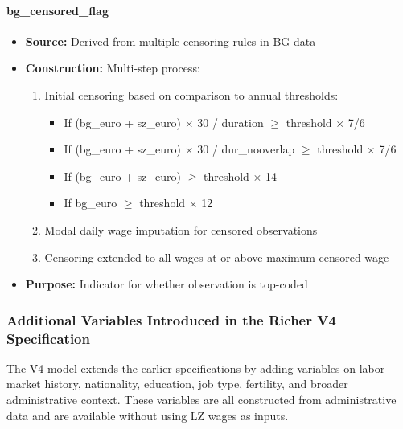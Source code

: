 \documentclass{article}
\begin{document}
\paragraph{bg\_censored\_flag}
\begin{itemize}
    \item \textbf{Source:} Derived from multiple censoring rules in BG data
    \item \textbf{Construction:} Multi-step process:
    \begin{enumerate}
        \item Initial censoring based on comparison to annual thresholds:
        \begin{itemize}
            \item If (bg\_euro + sz\_euro) $\times$ 30 / duration $\geq$ threshold $\times$ 7/6
            \item If (bg\_euro + sz\_euro) $\times$ 30 / dur\_nooverlap $\geq$ threshold $\times$ 7/6  
            \item If (bg\_euro + sz\_euro) $\geq$ threshold $\times$ 14
            \item If bg\_euro $\geq$ threshold $\times$ 12
        \end{itemize}
        \item Modal daily wage imputation for censored observations
        \item Censoring extended to all wages at or above maximum censored wage
    \end{enumerate}
    \item \textbf{Purpose: } Indicator for whether observation is top-coded
\end{itemize}










\subsubsection{Additional Variables Introduced in the Richer V4 Specification}

The V4 model extends the earlier specifications by adding variables on labor market history, nationality, education, job type, fertility, and broader administrative context. These variables are all constructed from administrative data and are available without using LZ wages as inputs.
\end{document}
